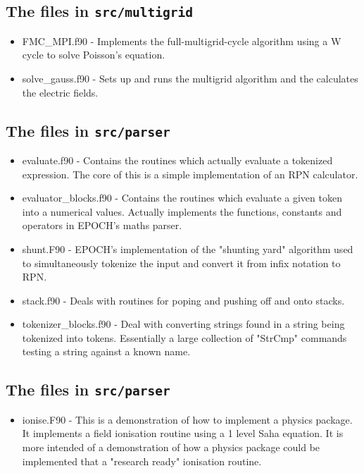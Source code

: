 \documentclass[12pt]{article}
\newcommand{\inlinecode}[1]{{\color{warwickred} \bf\texttt{#1}}}
\begin{document}
\subsection{The files in \inlinecode{src/multigrid}}
\begin{itemize}
\item FMC\_MPI.f90 - Implements the full-multigrid-cycle algorithm using a W
  cycle to solve Poisson's equation.
\item solve\_gauss.f90 - Sets up and runs the multigrid algorithm and the
  calculates the electric fields.
\end{itemize}

\subsection{The files in \inlinecode{src/parser}}
\begin{itemize}
\item evaluate.f90 - Contains the routines which actually evaluate a tokenized
  expression. The core of this is a simple implementation of an RPN
  calculator.
\item evaluator\_blocks.f90 - Contains the routines which evaluate a given
  token into a numerical values. Actually implements the functions, constants
  and operators in EPOCH's maths parser.
\item shunt.F90 - EPOCH's implementation of the "shunting yard" algorithm used
  to simultaneously tokenize the input and convert it from infix notation to
  RPN.
\item stack.f90 - Deals with routines for poping and pushing off and onto
  stacks.
\item tokenizer\_blocks.f90 - Deal with converting strings found in a string
  being tokenized into tokens. Essentially a large collection of "StrCmp"
  commands testing a string against a known name.
\end{itemize}

\subsection{The files in \inlinecode{src/parser}}
\begin{itemize}
\item ionise.F90 - This is a demonstration of how to implement a physics
  package. It implements a field ionisation routine using a 1 level Saha
  equation. It is more intended of a demonstration of how a physics package
  could be implemented that a "research ready" ionisation routine.
\end{itemize}
\end{document}
